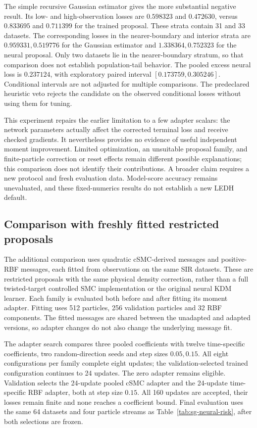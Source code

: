 The simple recursive Gaussian estimator gives the more substantial negative
result. Its low- and high-observation losses are \(0.598323\) and
\(0.472630\), versus \(0.833695\) and \(0.711399\) for the trained
proposal. These strata contain 31 and 33 datasets. The corresponding losses
in the nearer-boundary and interior strata are \(0.959331,0.519776\) for
the Gaussian estimator and \(1.338364,0.752323\) for the neural proposal.
Only two datasets lie in the nearer-boundary stratum, so that comparison
does not establish population-tail behavior. The pooled excess neural loss
is \(0.237124\), with exploratory paired interval
\([0.173759,0.305246]\). Conditional intervals are not adjusted for
multiple comparisons. The predeclared heuristic veto rejects the candidate
on the observed conditional losses without using them for tuning.

This experiment repairs the earlier limitation to a few adapter scalars:
the network parameters actually affect the corrected terminal loss and receive
checked gradients. It nevertheless provides no evidence of useful independent
moment improvement. Limited optimization, an unsuitable proposal family, and
finite-particle correction or reset effects remain different possible
explanations; this comparison does not identify their contributions. A broader
claim requires a new protocol and fresh evaluation data. Model-score accuracy
remains unevaluated, and these fixed-numerics results do not establish a new
LEDH default.

\subsection{Comparison with freshly fitted restricted proposals}
\label{sec:sg-neural-restricted-comparison}

The additional comparison uses quadratic cSMC-derived messages and positive-RBF
messages, each fitted from observations on the same SIR datasets. These are
restricted proposals with the same physical density correction, rather than a
full twisted-target controlled SMC implementation or the original neural KDM
learner. Each family is evaluated both before and after fitting its moment
adapter. Fitting uses 512 particles, 256 validation particles and 32 RBF
components. The fitted messages are shared between the unadapted and adapted
versions, so adapter changes do not also change the underlying message fit.

The adapter search compares three pooled coefficients with twelve time-specific
coefficients, two random-direction seeds and step sizes \(0.05,0.15\). All
eight configurations per family complete eight updates; the validation-selected
trained configuration continues to 24 updates. The zero adapter remains
eligible. Validation selects the 24-update pooled cSMC adapter and the
24-update time-specific RBF adapter, both at step size \(0.15\). All 160
updates are accepted, their losses remain finite and none reaches a coefficient
bound. Final evaluation uses the same 64 datasets and four particle streams
as Table~\ref{tab:sg-neural-risk}, after both selections are frozen.

